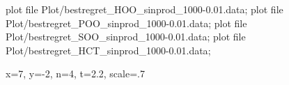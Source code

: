 \documentclass{article}
\begin{document}
{\begin{mygraph}
                {}{}
   plot file {Plot/bestregret_HOO_sinprod_1000-0.01.data};
   plot file {Plot/bestregret_POO_sinprod_1000-0.01.data};
   plot file {Plot/bestregret_SOO_sinprod_1000-0.01.data};
   plot file {Plot/bestregret_HCT_sinprod_1000-0.01.data};
  \begin{mylegend}{x=7, y=-2, n=4, t=2.2, scale=.7}
	  \end{mylegend}
\end{mygraph}}
\end{document}
